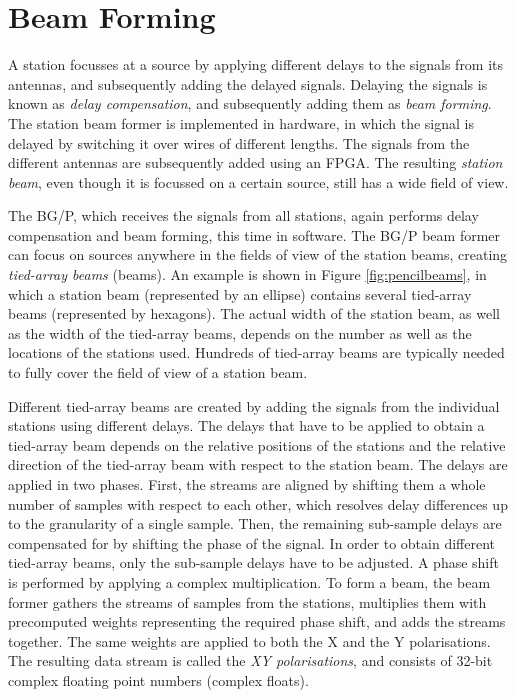 \documentclass{llncs}
\begin{document}

\section{Beam Forming}
\label{Sec:Beamforming}

A station focusses at a source by applying different delays to the signals from its antennas, and subsequently adding the delayed signals. Delaying the signals is known as \emph{delay compensation}, and subsequently adding them as \emph{beam forming}. The station beam former is implemented in hardware, in which the signal is delayed by switching it over wires of different lengths. The signals from the different antennas are subsequently added using an FPGA. The resulting \emph{station beam}, even though it is focussed on a certain source, still has a wide field of view.

The BG/P, which receives the signals from all stations, again performs delay compensation and beam forming, this time in software. The BG/P beam former can focus on sources anywhere in the fields of view of the station beams, creating \emph{tied-array beams} (beams). An example is shown in Figure \ref{fig:pencilbeams}, in which a station beam (represented by an ellipse) contains several tied-array beams (represented by hexagons). The actual width of the station beam, as well as the width of the tied-array beams, depends on the number as well as the locations of the stations used. Hundreds of tied-array beams are typically needed to fully cover the field of view of a station beam.

Different tied-array beams are created by adding the signals from the individual stations using different delays. The delays that have to be applied to obtain a tied-array beam depends on the relative positions of the stations and the relative direction of the tied-array beam with respect to the station beam. The delays are applied in two phases. First, the streams are aligned by shifting them a whole number of samples with respect to each other, which resolves delay differences up to the granularity of a single sample. Then, the remaining sub-sample delays are compensated for by shifting the phase of the signal. In order to obtain different tied-array beams, only the sub-sample delays have to be adjusted. A phase shift is performed by applying a complex multiplication. To form a beam, the beam former gathers the streams of samples from the stations, multiplies them with precomputed weights representing the required phase shift, and adds the streams together. The same weights are applied to both the X and the Y polarisations. The resulting data stream is called the \emph{XY polarisations}, and consists of 32-bit complex floating point numbers (complex floats).
\end{document}
